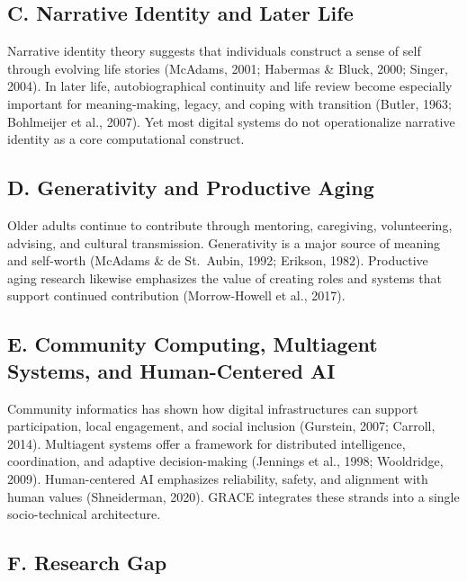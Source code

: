 \documentclass[
  journal,
]{IEEEtran}%
\begin{document}
\subsection{C. Narrative Identity and Later
Life}\label{c.-narrative-identity-and-later-life}

Narrative identity theory suggests that individuals construct a sense of
self through evolving life stories (McAdams, 2001; Habermas \& Bluck,
2000; Singer, 2004). In later life, autobiographical continuity and life
review become especially important for meaning-making, legacy, and
coping with transition (Butler, 1963; Bohlmeijer et al., 2007). Yet most
digital systems do not operationalize narrative identity as a core
computational construct.

\subsection{D. Generativity and Productive
Aging}\label{d.-generativity-and-productive-aging}

Older adults continue to contribute through mentoring, caregiving,
volunteering, advising, and cultural transmission. Generativity is a
major source of meaning and self-worth (McAdams \& de St.~Aubin, 1992;
Erikson, 1982). Productive aging research likewise emphasizes the value
of creating roles and systems that support continued contribution
(Morrow-Howell et al., 2017).

\subsection{E. Community Computing, Multiagent Systems, and
Human-Centered
AI}\label{e.-community-computing-multiagent-systems-and-human-centered-ai}

Community informatics has shown how digital infrastructures can support
participation, local engagement, and social inclusion (Gurstein, 2007;
Carroll, 2014). Multiagent systems offer a framework for distributed
intelligence, coordination, and adaptive decision-making (Jennings et
al., 1998; Wooldridge, 2009). Human-centered AI emphasizes reliability,
safety, and alignment with human values (Shneiderman, 2020). GRACE
integrates these strands into a single socio-technical architecture.

\subsection{F. Research Gap}\label{f.-research-gap}
\end{document}
